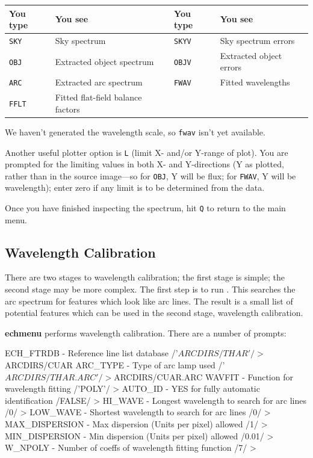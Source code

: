 \documentclass[twoside,11pt]{starlink}
\providecommand{\mlabel}[1]{\xlabel{#1}\label{#1}}
\providecommand{\scspec}[2]{#1}
\begin{document}
\begin{center}
\begin{tabular}{llll}
 You type & You see & You type & You see\\ \hline
 \texttt{SKY}  & Sky spectrum & \texttt{SKYV} & Sky spectrum errors\\
 \texttt{OBJ}  & Extracted object spectrum & \texttt{OBJV} & Extracted object errors\\
 \texttt{ARC}  & Extracted arc spectrum & \texttt{FWAV} & Fitted wavelengths\\
 \texttt{FFLT} & Fitted flat-field balance factors\\ \hline
\end{tabular}
\end{center}


We haven't generated the wavelength scale, so \verb+fwav+ isn't yet
available.

Another useful plotter option is \verb+L+ (limit X- and/or Y-range of plot).
You are prompted for the limiting values in both X- and Y-directions
(Y as plotted, rather than in the source image\scspec{---}{ - }so for
\verb+OBJ+, Y will be flux; for \verb+FWAV+, Y will be wavelength); enter
zero if any limit is to be determined from the data.

Once you have finished inspecting the spectrum, hit \verb+Q+ to return to
the main menu.


\subsection{\mlabel{example_wavelength_calibration}Wavelength Calibration}

There are two stages to 
wavelength calibration; the first stage is simple; the second stage may
be more complex.
The first step is to run
\@.
This searches the arc spectrum for features which look like arc lines.
The result is a small list of potential features which can be used in
the second stage, wavelength calibration.

\textbf{echmenu} 
performs wavelength calibration.
There are a number of prompts:

{
\scspec{\small}{ }
\begin{terminalv}
   ECH_FTRDB - Reference line list database /'$ARCDIRS/THAR'/ > $ARCDIRS/CUAR
   ARC_TYPE - Type of arc lamp used /'$ARCDIRS/THAR.ARC'/ > $ARCDIRS/CUAR.ARC
   WAVFIT - Function for wavelength fitting /'POLY'/ >
   AUTO_ID - YES for fully automatic identification /FALSE/ >
   HI_WAVE - Longest wavelength to search for arc lines /0/ >
   LOW_WAVE - Shortest wavelength to search for arc lines /0/ >
   MAX_DISPERSION - Max dispersion (Units per pixel) allowed /1/ >
   MIN_DISPERSION - Min dispersion (Units per pixel) allowed /0.01/ >
   W_NPOLY - Number of coeffs of wavelength fitting function /7/ >
\end{terminalv}
}
\end{document}
